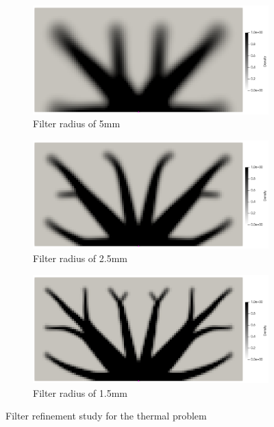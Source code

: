 \begin{figure}[ht]
  \centering
  \begin{subfigure}[b]{0.45\linewidth}
    \includegraphics[width=\linewidth]{figures/chapter_4/FilterRefinementThermal5.png}
    \caption{Filter radius of 5mm}
  \end{subfigure}
  \hfill
  \begin{subfigure}[b]{0.45\linewidth}
    \includegraphics[width=\linewidth]{figures/chapter_4/FilterRefinementThermal25.png}
    \caption{Filter radius of 2.5mm}
  \end{subfigure}
  \begin{subfigure}[b]{0.45\linewidth}
    \includegraphics[width=\linewidth]{figures/chapter_4/FilterRefinementThermal15.png}
    \caption{Filter radius of 1.5mm}
  \end{subfigure}
  \caption{Filter refinement study for the thermal problem}
  \label{fig:radius_refinement_thermal}
\end{figure}

